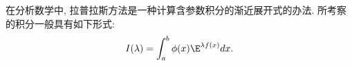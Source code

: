 

在分析数学中, 拉普拉斯方法是一种计算含参数积分的渐近展开式的办法. 所考察的积分一般具有如下形式:
\begin{equation}\label{LapAsm_eq1}
I(\lambda)=\int_a^b \phi(x)\E^{\lambda f(x)}dx.
\end{equation}
